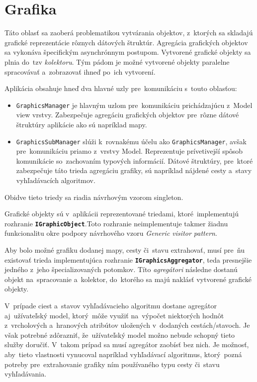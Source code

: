 \pagebreak

\section{Grafika}

Táto oblasť sa zaoberá problematikou vytvárania objektov, z~ktorých sa skladajú grafické reprezentácie rôznych dátových štruktúr. Agregácia grafických objektov sa vykonáva špecifickým asynchrónnym postupom. Vytvorené grafické objekty sa plnia do~tzv \textit{kolektoru}. Tým pádom je možné vytvorené objekty paralelne spracovávať a~zobrazovať ihneď po~ich vytvorení. 

Aplikácia obsahuje hneď dva hlavné uzly pre~komunikáciu s~touto oblasťou:
\begin{itemize}
    \item \texttt{GraphicsManager} je hlavným uzlom pre~komunikáciu prichádzajúcu z~Model view vrstvy. Zabezpečuje agregáciu grafických objektov pre~rôzne dátové štruktúry aplikácie ako sú napríklad mapy.
    \item \texttt{GraphicsSubManager} slúži k~rovnakému účelu ako \texttt{GraphicsManager}, avšak pre~komunikáciu priamo z~vrstvy Model. Reprezentuje prívetivejší spôsob komunikácie so~zachovaním typových informácií. Dátové štruktúry, pre~ktoré zabezpečuje táto trieda agregáciu grafiky, sú napríklad nájdené cesty a~stavy vyhľadávacích algoritmov. 
\end{itemize}
Obidve tieto triedy sa riadia návrhovým vzorom singleton.

\bigskip

Grafické objekty sú v~aplikácii reprezentované triedami, ktoré~implementujú rozhranie \textbf{\texttt{IGraphicObject}}.Toto rozhranie neimplementuje takmer žiadnu funkcionalitu okre podpory návrhového vzoru \textit{Generic visitor pattern}.

Aby bolo možné grafiku dodanej mapy, cesty či~stavu extrahovať, musí pre~ňu existovať trieda implementujúca rozhranie \textbf{\texttt{IGraphicsAggregator}}, teda presnejšie jedného z~jeho špecializovaných potomkov. Títo \textit{agregátori} následne dostanú objekt na~spracovanie a~kolektor, do~ktorého sa majú naklásť vytvorené grafické objekty.

V~prípade ciest a~stavov vyhľadávacieho algoritmu dostane agregátor aj~užívateľský model, ktorý~môže využiť na~výpočet niektorých hodnôt z~vrcholových a~hranových atribútov uložených v~dodaných cestách/stavoch. Je však potrebné zdôrazniť, že~užívateľský model možno nebude schopný tieto služby doručiť. V~takom prípad sa musí agregátor zaobísť bez nich. Je možnosť, aby~tieto vlastnosti vynucoval napríklad vyhľadávací algoritmus, ktorý~pozná potreby pre~extrahovanie grafiky ním používaného typu cesty či~stavu vyhľadávania.

